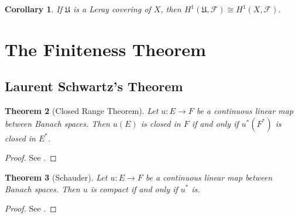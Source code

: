 \documentclass[12pt]{article}
\theoremstyle{thmstyle}
\newtheorem{theorem}{Theorem}[section]
\theoremstyle{defstyle}
\newtheorem{corollary}[theorem]{Corollary}
\newcommand{\frakU}{\mathfrak{U}}
\newcommand{\scrF}{\mathscr F}
\begin{document}
\begin{corollary}
    If $\frakU$ is a Leray covering of $X$, then $H^1(\frakU,\scrF)\cong H^1(X,\scrF)$.
\end{corollary}

\section{The Finiteness Theorem}

\subsection{Laurent Schwartz's Theorem}

\begin{theorem}[Closed Range Theorem]
    Let $u: E\to F$ be a continuous linear map between Banach spaces. Then $u(E)$ is closed in $F$ if and only if $u^{\ast}(F^\ast)$ is closed in $E^\ast$.
\end{theorem}
\begin{proof}
    See \cite[Theorem 4.14]{grandpa-rudin}.
\end{proof}

\begin{theorem}[Schauder]
    Let $u: E\to F$ be a continuous linear map between Banach spaces. Then $u$ is compact if and only if $u^\ast$ is.
\end{theorem}
\begin{proof}
    See \cite[Theorem 4.19]{grandpa-rudin}.
\end{proof}
\end{document}
